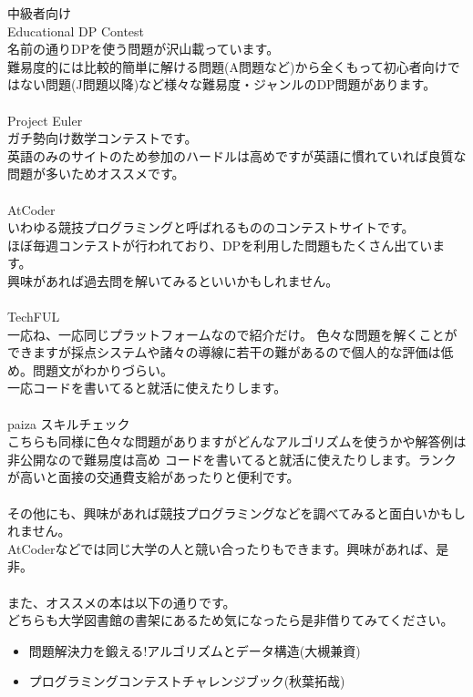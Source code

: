{\Large 中級者向け}\\
Educational DP Contest\\
名前の通りDPを使う問題が沢山載っています。\\
難易度的には比較的簡単に解ける問題(A問題など)から全くもって初心者向けではない問題(J問題以降)など様々な難易度・ジャンルのDP問題があります。
\\ \\ \noindent
Project Euler\\
ガチ勢向け数学コンテストです。\\
英語のみのサイトのため参加のハードルは高めですが英語に慣れていれば良質な問題が多いためオススメです。
\\ \\ \noindent
AtCoder\\
いわゆる競技プログラミングと呼ばれるもののコンテストサイトです。\\
ほぼ毎週コンテストが行われており、DPを利用した問題もたくさん出ています。\\
興味があれば過去問を解いてみるといいかもしれません。
\\ \\ \noindent
TechFUL\\
一応ね、一応同じプラットフォームなので紹介だけ。
色々な問題を解くことができますが採点システムや諸々の導線に若干の難があるので個人的な評価は低め。問題文がわかりづらい。\\
一応コードを書いてると就活に使えたりします。
\\ \\ \noindent
paiza スキルチェック\\
こちらも同様に色々な問題がありますがどんなアルゴリズムを使うかや解答例は非公開なので難易度は高め
コードを書いてると就活に使えたりします。ランクが高いと面接の交通費支給があったりと便利です。
\\ \\ \noindent
その他にも、興味があれば競技プログラミングなどを調べてみると面白いかもしれません。\\
AtCoderなどでは同じ大学の人と競い合ったりもできます。興味があれば、是非。
\\ \\ \noindent
また、オススメの本は以下の通りです。\\
どちらも大学図書館の書架にあるため気になったら是非借りてみてください。

\begin{itemize}
    \item 問題解決力を鍛える!アルゴリズムとデータ構造(大槻兼資)
    \item プログラミングコンテストチャレンジブック(秋葉拓哉)
\end{itemize}

